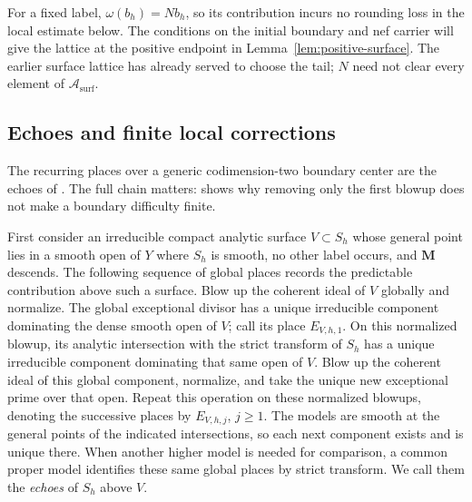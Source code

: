\documentclass[11pt]{amsart}
\theoremstyle{definition}
\theoremstyle{remark}
\numberwithin{equation}{section}
\newcommand{\M}{\mathbf{M}}
\begin{document}
For a fixed label, \(\omega(b_h)=Nb_h\), so its contribution incurs no
rounding loss in the local estimate below.  The conditions on the initial
boundary and nef carrier will give the lattice at the positive endpoint in
Lemma~\ref{lem:positive-surface}.  The earlier surface lattice has already
served to choose the tail; \(N\) need not clear every element of
\(\mathcal A_{\mathrm{surf}}\).

\subsection{Echoes and finite local corrections}

The recurring places over a generic codimension-two boundary center are
the echoes of \cite[Example~1.4, Lemma~1.5, and Definition~2.3]{AlexeevHaconKawamata2007}.
The full chain matters: \cite[Example~2.1]{Fujino2005Addendum} shows why
removing only the first blowup does not make a boundary difficulty finite.

First consider an irreducible compact analytic surface \(V\subset S_h\)
whose general point lies in a smooth open of \(Y\) where \(S_h\) is smooth,
no other label occurs, and \(\M\) descends.  The following sequence of
global places records the predictable contribution above such a surface.
Blow up the coherent ideal of \(V\) globally and normalize.  The global
exceptional divisor has a unique irreducible component dominating the dense
smooth open of \(V\); call its place \(E_{V,h,1}\).  On this normalized
blowup, its analytic intersection with the strict transform of \(S_h\)
has a unique irreducible component dominating that same open of \(V\).
Blow up the coherent ideal of this global component, normalize, and take
the unique new exceptional prime over that open.  Repeat this operation on
these normalized blowups, denoting the successive places by
\(E_{V,h,j}\), \(j\geq1\).  The models are smooth at the general points
of the indicated intersections, so each next component exists and is
unique there.  When another higher model is needed for comparison, a common
proper model identifies these same global places by strict transform.  We
call them the \emph{echoes} of \(S_h\) above \(V\).
\end{document}
